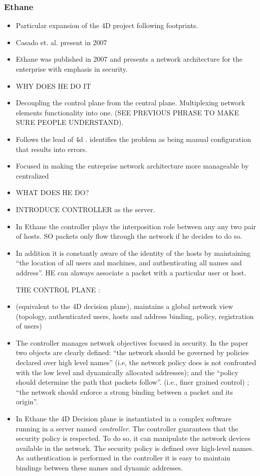 \begin{itemize}
\subsubsection{Ethane}

\begin{itemize}
\item Particular expansion of the 4D project following footprints. 
\item Casado et. al. present in 2007  \cite{Casado:2007kb}
\item Ethane \cite{Casado:2007kb} was published in 2007 and presents a
network architecture for the enterprise with emphasis in
security. 


\item WHY DOES HE DO IT
\item Decoupling the control plane from the central plane. Multiplexing network elements functionality into one.  (SEE PREVIOUS PHRASE TO MAKE SURE PEOPLE UNDERSTAND). 

\item Follows the lead of 4d . identifies the problem as being manual configuration that results into errors. 
\item Focused in making the entreprise network architecture more manageable by centralized 


\item WHAT DOES HE DO? 
\item INTRODUCE CONTROLLER as the server. 
\item In Ethane the controller plays the interposition role between any any two pair of hosts.  SO packets only flow through the network if he decides to do so. 
\item  In addition it is constantly aware of the identity of the hosts by maintaining ``the location of all users and machines, and authenticating all names and address''. HE can alaways associate a packet with a particular user or host. 




THE CONTROL PLANE : 
\item (equivalent to the 4D decision plane), maintains a global network view (topology, authenticated users, hosts and address binding, policy, registration of users)
\item The controller manages network objectives focused in security. In the paper two objects are clearly defined:  ``the network should be governed by policies declared over high level names'' (i.e, the network policy does is not confronted with the low level and dynamically allocated addresses);  and  the ``policy should determine the path that packets follow''.  (i.e., finer grained control) ; ``the network should enforce a strong binding between a packet and its origin''. 
\item In Ethane the 4D Decision plane  is instantiated in a complex software
running in a server named \emph{controller}. The controller guarantees
that the security policy is respected. To do so, it can manipulate the network
devices available in the network. 
The security policy is defined over
high-level names. As authentication is performed in the controller it is easy to maintain
bindings between these names and dynamic addresses. 


\end{itemize}
\end{itemize}
